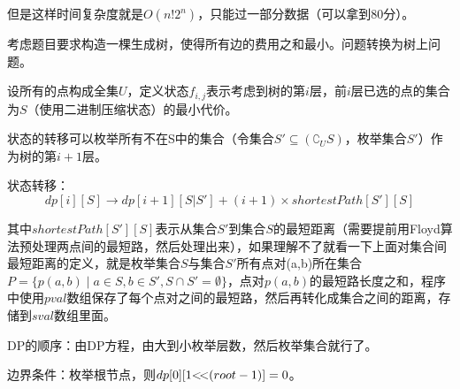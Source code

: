 	但是这样时间复杂度就是$O(n!2^n)$，只能过一部分数据（可以拿到80分）。

	考虑题目要求构造一棵生成树，使得所有边的费用之和最小。问题转换为树上问题。

	设所有的点构成全集$U$，定义状态$f_{i,j}$表示考虑到树的第$i$层，前$i$层已选的点的集合为$S$（使用二进制压缩状态）的最小代价。

	状态的转移可以枚举所有不在S中的集合（令集合$S'\subseteq(\complement_U S)$，枚举集合$S'$）作为树的第$i+1$层。

	状态转移：
	\begin{equation*}
		dp[i][S]\to dp[i+1][S|S']+(i+1)\times shortestPath[S'][S]
	\end{equation*}

	其中$shortestPath[S'][S]$表示从集合$S'$到集合$S$的最短距离（需要提前用Floyd算法预处理两点间的最短路，然后处理出来），如果理解不了就看一下上面对集合间最短距离的定义，就是枚举集合$S$与集合$S'$所有点对(a,b)所在集合$P=\{p(a,b)\mid a\in S, b\in S', S\cap S'=\emptyset\}$，点对$p(a,b)$的最短路长度之和，程序中使用$pval$数组保存了每个点对之间的最短路，然后再转化成集合之间的距离，存储到$sval$数组里面。

	DP的顺序：由DP方程，由大到小枚举层数，然后枚举集合就行了。

	边界条件：枚举根节点，则$dp[0][1\text{<\!<}(root-1)]=0$。

